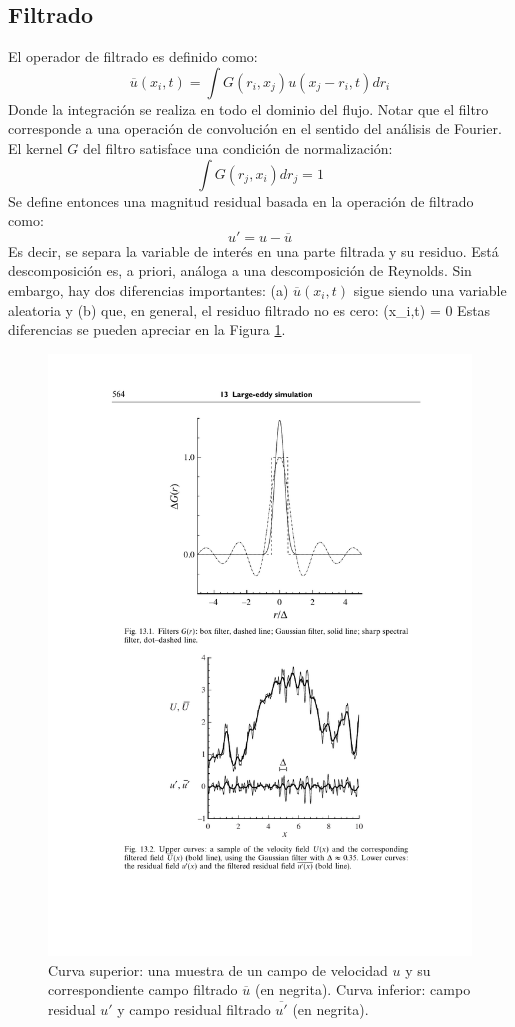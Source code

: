 \subsection{Filtrado}
El operador de filtrado es definido como:
\begin{equation}
\overline{u}(x_i,t) = \int G(r_i,x_j) u(x_j-r_i,t)dr_i
\end{equation}
Donde la integración se realiza en todo el dominio del flujo. Notar que el filtro corresponde a una operación de convolución en el sentido del análisis de Fourier. El kernel $G$ del filtro satisface una condición de normalización:
\begin{equation}
\int G(r_j,x_i)dr_j = 1
\end{equation}
Se define entonces una magnitud residual basada en la operación de filtrado como:
\begin{equation}
u' = u - \overline{u}
\end{equation}
Es decir, se separa la variable de interés en una parte filtrada y su residuo. Está descomposición es, a priori, análoga a una descomposición de Reynolds. Sin embargo, hay dos diferencias importantes: (a) $\overline{u}(x_i,t)$ sigue siendo una variable aleatoria y (b) que, en general, el residuo filtrado no es cero:
\be {}(x_i,t) \not= 0 \ee
Estas diferencias se pueden apreciar en la Figura \ref{fig:03_les}.
\begin{figure}[h!]
	\centering
	\includegraphics[width=0.6\linewidth,trim={4.8cm 4.8cm 2.8cm 12.1cm},clip]{Imagenes/03/les}
	\caption{Curva superior: una muestra de un campo de velocidad $u$ y su correspondiente campo filtrado $\overline{u}$ (en negrita). Curva inferior: campo residual $u'$ y campo residual filtrado $\overline{u'}$ (en negrita).}
	\label{fig:03_les}
\end{figure}

